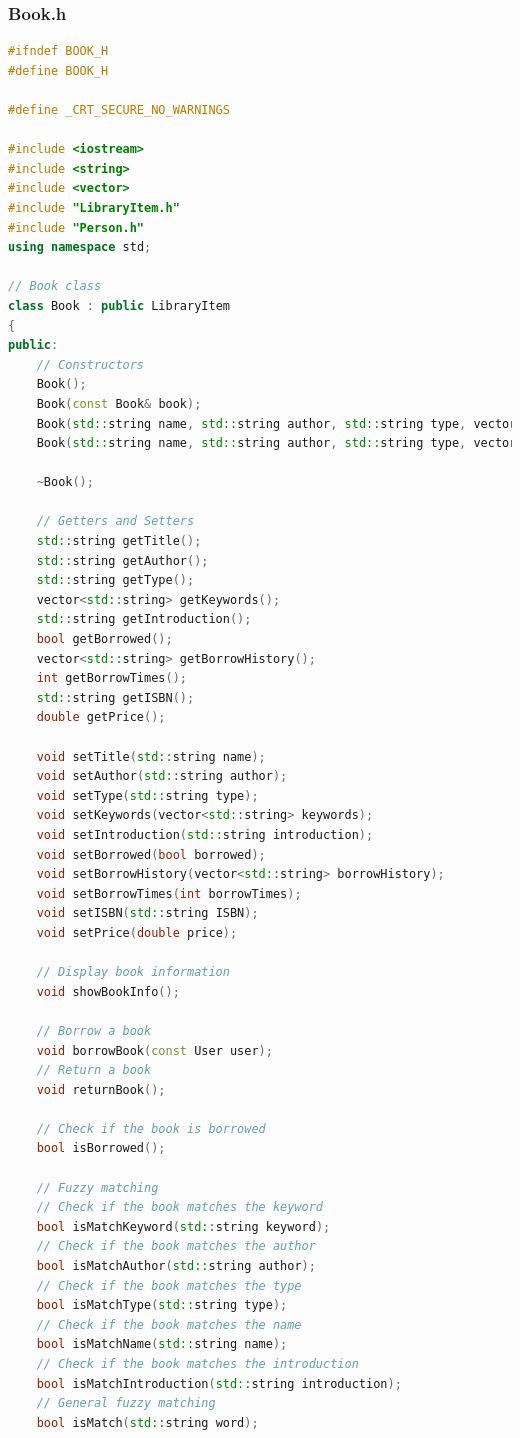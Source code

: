 \documentclass[12pt,twoside]{ctexart}
\begin{document}
\newpage
\subsubsection{Book.h}

\begin{lstlisting}[language=C++]
#ifndef BOOK_H
#define BOOK_H

#define _CRT_SECURE_NO_WARNINGS

#include <iostream>
#include <string>
#include <vector>
#include "LibraryItem.h"
#include "Person.h"
using namespace std;

// Book class
class Book : public LibraryItem
{
public:
    // Constructors
    Book();
    Book(const Book& book);
    Book(std::string name, std::string author, std::string type, vector<std::string> keywords, std::string introduction, std::string ISBN, double price);
    Book(std::string name, std::string author, std::string type, vector<std::string> keywords, std::string introduction, bool borrowed, vector<std::string> borrowHistory, int borrowTimes, std::string ISBN, double price);

    ~Book();

    // Getters and Setters
    std::string getTitle();
    std::string getAuthor();
    std::string getType();
    vector<std::string> getKeywords();
    std::string getIntroduction();
    bool getBorrowed();
    vector<std::string> getBorrowHistory();
    int getBorrowTimes();
    std::string getISBN();
    double getPrice();

    void setTitle(std::string name);
    void setAuthor(std::string author);
    void setType(std::string type);
    void setKeywords(vector<std::string> keywords);
    void setIntroduction(std::string introduction);
    void setBorrowed(bool borrowed);
    void setBorrowHistory(vector<std::string> borrowHistory);
    void setBorrowTimes(int borrowTimes);
    void setISBN(std::string ISBN);
    void setPrice(double price);

    // Display book information
    void showBookInfo();

    // Borrow a book
    void borrowBook(const User user);
    // Return a book
    void returnBook();

    // Check if the book is borrowed
    bool isBorrowed();

    // Fuzzy matching
    // Check if the book matches the keyword
    bool isMatchKeyword(std::string keyword);
    // Check if the book matches the author
    bool isMatchAuthor(std::string author);
    // Check if the book matches the type
    bool isMatchType(std::string type);
    // Check if the book matches the name
    bool isMatchName(std::string name);
    // Check if the book matches the introduction
    bool isMatchIntroduction(std::string introduction);
    // General fuzzy matching
    bool isMatch(std::string word);


\end{lstlisting}
\end{document}
